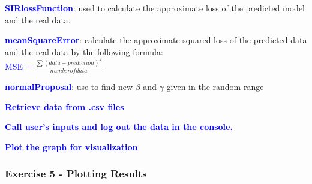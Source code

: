 \documentclass[a4paper]{article}
\begin{document}
    \textbf{\textcolor{blue}{SIRlossFunction}}: used to calculate the approximate loss of the predicted model and the real data.
    
    
    
    \textbf{\textcolor{blue}{meanSquareError}}: calculate the approximate squared loss of the predicted data and the real data by the following formula:
    \\
    \textcolor{blue}{MSE = } $\frac{\sum(data - prediction)^2}{number of data}$
    
    
    \textbf{\textcolor{blue}{normalProposal}}: use to find new $\beta$ and $\gamma$ given in the random range
    
   
   \textbf{\textcolor{blue}{Retrieve data from .csv files}}
   
   
   \textbf{\textcolor{blue}{Call user's inputs and log out the data in the console.}}
   
   
   \textbf{\textcolor{blue}{Plot the graph for visualization}}
   
   
    \subsubsection{Exercise 5 - Plotting Results}
\end{document}
